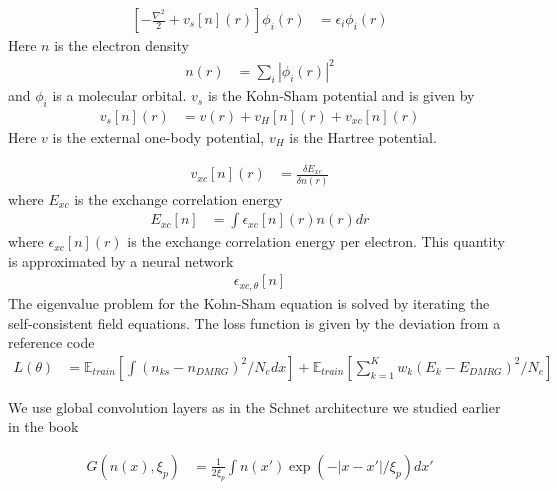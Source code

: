 \documentclass[book.tex]{subfiles}
\begin{document}
\begin{align}
    \left [ -\frac{\nabla^2}{2} + v_s[n](r) \right] \phi_i(r) &= \epsilon_i \phi_i(r)
\end{align}
Here $n$ is the electron density
\begin{align}
    n(r) &= \sum_i |\phi_i(r)|^2
\end{align}
and $\phi_i$ is a molecular orbital. $v_s$ is the Kohn-Sham potential and is given by
\begin{align}
v_s[n](r) &= v(r) + v_H[n](r) + v_{xc}[n](r)
\end{align}
Here $v$ is the external one-body potential, $v_H$ is the Hartree potential. 

\begin{align}
    v_{xc}[n](r) &= \frac{\delta E_{xc}}{\delta n(r)}
\end{align}
where $E_{xc}$ is the exchange correlation energy
\begin{align}
    E_{xc}[n] &= \int \epsilon_{xc}[n](r) n(r) dr
\end{align}
where $\epsilon_{xc}[n](r)$ is the exchange correlation energy per electron. This quantity is approximated by a neural network
\begin{align}
    \epsilon_{xc,\theta}[n]
\end{align}
The eigenvalue problem for the Kohn-Sham equation is solved by iterating the self-consistent field equations. %
The loss function is given by the deviation from a reference code
\begin{align}
L(\theta) &= \mathbb{E}_{train}\left [\int  (n_{ks}-n_{DMRG})^2/N_e dx \right ] + \mathbb{E}_{train}\left [\sum_{k=1}^K w_k (E_k - E_{DMRG})^2/N_e\right ]
\end{align}

We use global convolution layers as in the Schnet architecture we studied earlier in the book

\begin{align}
G(n(x), \xi_p) &= \frac{1}{2\xi_p} \int  n(x') \exp(-|x-x'|/\xi_p) dx'
\end{align}





\end{document}
